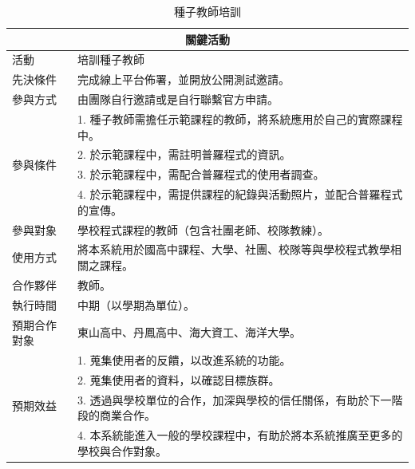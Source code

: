 \begin{table}[H]
  \centering
  \caption{種子教師培訓}
  \begin{tabular}{|l|l|}
      \hline
      \multicolumn{2}{|c|}{\textbf{關鍵活動}} \\ \hline
      活動 & 培訓種子教師 \\ \hline
      先決條件 & 完成線上平台佈署，並開放公開測試邀請。 \\ \hline
      參與方式 & 由團隊自行邀請或是自行聯繫官方申請。 \\ \hline
      \multirow{4}{*}{參與條件}       
      & 1. 種子教師需擔任示範課程的教師，將系統應用於自己的實際課程中。\\
      & 2. 於示範課程中，需註明普羅程式的資訊。 \\ 
      & 3. 於示範課程中，需配合普羅程式的使用者調查。 \\ 
      & 4. 於示範課程中，需提供課程的紀錄與活動照片，並配合普羅程式的宣傳。 \\ \hline
      參與對象 & 學校程式課程的教師（包含社團老師、校隊教練）。 \\ \hline
      使用方式 & 將本系統用於國高中課程、大學、社團、校隊等與學校程式教學相關之課程。 \\ \hline 
      合作夥伴 & 教師。 \\ \hline 
      執行時間 & 中期（以學期為單位）。 \\ \hline
      預期合作對象 & 東山高中、丹鳳高中、海大資工、海洋大學。 \\ \hline
      \multirow{4}{*}{預期效益}    
      & 1. 蒐集使用者的反饋，以改進系統的功能。 \\
      & 2. 蒐集使用者的資料，以確認目標族群。 \\
      & 3. 透過與學校單位的合作，加深與學校的信任關係，有助於下一階段的商業合作。 \\
      & 4. 本系統能進入一般的學校課程中，有助於將本系統推廣至更多的學校與合作對象。 \\ \hline
  \end{tabular}
\end{table}

